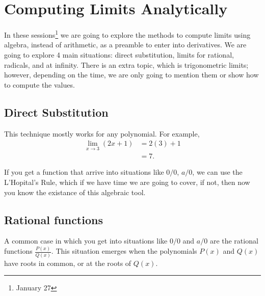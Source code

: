 \documentclass[../main-notes.tex]{subfile}
\begin{document}
\newpage 

\section{Computing Limits Analytically}

In these sessions\footnote{January 27} we are going to explore the methods to compute limits using algebra, instead of arithmetic, as a preamble to enter into derivatives.
We are going to explore 4 main situations: direct substitution, limits for rational, radicals, and at infinity.
There is an extra topic, which is trigonometric limits; however, depending on the time, we are only going to mention them or show how to compute the values.


\subsection{Direct Substitution}

This technique mostly works for any polynomial.
For example,
\begin{align*}
    \lim_{x\to 3}\left(2x+1\right) &= 2(3)+1 \\
                                   &= 7.
\end{align*}

If you get a function that arrive into situations like $0/0$, $a/0$, we can use the L'Hopital's Rule, which if we have time we are going to cover, if not, then now you know the existance of this algebraic tool.

\subsection{Rational functions}

A common case in which you get into situations like $0/0$ and $a/0$ are the rational functions \(\frac{P(x)}{Q(x)}\).
This situation emerges when the polynomials $P(x)$ and $Q(x)$ have roots in common, or at the roots of $Q(x)$.
\end{document}
